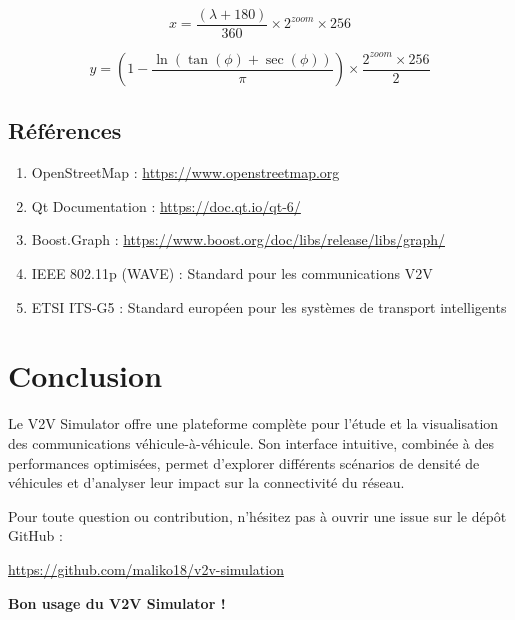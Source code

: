 \documentclass[12pt,a4paper]{article}
\begin{document}
\begin{equation}
x = \frac{(\lambda + 180)}{360} \times 2^{zoom} \times 256
\end{equation}

\begin{equation}
y = \left(1 - \frac{\ln(\tan(\phi) + \sec(\phi))}{\pi}\right) \times \frac{2^{zoom} \times 256}{2}
\end{equation}

\subsection{Références}

\begin{enumerate}
    \item OpenStreetMap : \url{https://www.openstreetmap.org}
    \item Qt Documentation : \url{https://doc.qt.io/qt-6/}
    \item Boost.Graph : \url{https://www.boost.org/doc/libs/release/libs/graph/}
    \item IEEE 802.11p (WAVE) : Standard pour les communications V2V
    \item ETSI ITS-G5 : Standard européen pour les systèmes de transport intelligents
\end{enumerate}

\section*{Conclusion}

Le V2V Simulator offre une plateforme complète pour l'étude et la visualisation des communications véhicule-à-véhicule. Son interface intuitive, combinée à des performances optimisées, permet d'explorer différents scénarios de densité de véhicules et d'analyser leur impact sur la connectivité du réseau.

Pour toute question ou contribution, n'hésitez pas à ouvrir une issue sur le dépôt GitHub :

\begin{center}
\url{https://github.com/maliko18/v2v-simulation}
\end{center}

\vspace{1cm}
\begin{center}
\textcolor{v2vprimary}{\Large\textbf{Bon usage du V2V Simulator !}}
\end{center}
\end{document}
